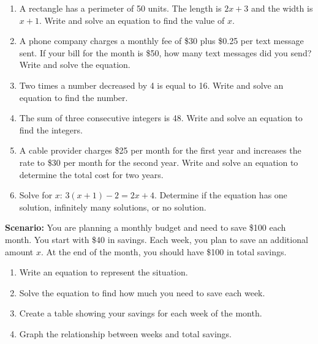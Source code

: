 \documentclass[12pt]{article}
\begin{document}
\begin{tcolorbox}[colframe=black!60, colback=white, 
coltitle=black, colbacktitle=black!15, fonttitle=\bfseries\Large, 
title=Problems, halign title=center, left=10pt, right=10pt, top=10pt, bottom=60pt]
\begin{enumerate}[start=9, itemsep=3em]
    \item A rectangle has a perimeter of 50 units. The length is \(2x + 3\) and the width is \(x + 1\). Write and solve an equation to find the value of \(x\).
    \item A phone company charges a monthly fee of \$30 plus \$0.25 per text message sent. If your bill for the month is \$50, how many text messages did you send? Write and solve the equation.
    \item Two times a number decreased by 4 is equal to 16. Write and solve an equation to find the number.
    \item The sum of three consecutive integers is 48. Write and solve an equation to find the integers.
    \item A cable provider charges \$25 per month for the first year and increases the rate to \$30 per month for the second year. Write and solve an equation to determine the total cost for two years.
    \item Solve for \(x\): \(3(x + 1) - 2 = 2x + 4\). Determine if the equation has one solution, infinitely many solutions, or no solution.
\end{enumerate}
\end{tcolorbox}

\vspace{1em}

\begin{tcolorbox}[colframe=black!60, colback=white, 
coltitle=black, colbacktitle=black!15, fonttitle=\bfseries\Large, 
title=Performance Task: Budget Planning, halign title=center, left=10pt, right=10pt, top=10pt, bottom=50pt]
\textbf{Scenario:} You are planning a monthly budget and need to save \$100 each month. You start with \$40 in savings. Each week, you plan to save an additional amount \(x\). At the end of the month, you should have \$100 in total savings.
\begin{enumerate}[itemsep=2em]
    \item Write an equation to represent the situation.
    \item Solve the equation to find how much you need to save each week.
    \item Create a table showing your savings for each week of the month.
    \item Graph the relationship between weeks and total savings.
\end{enumerate}
\end{tcolorbox}
\end{document}
